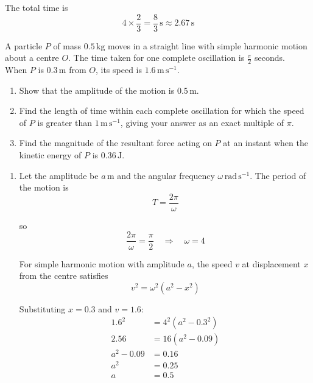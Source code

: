 \documentclass[leqno]{article}
\begin{document}
\begin{enumerate}[
  label=\textbf{\arabic*.},
  leftmargin=*,
  topsep=0pt,
  partopsep=0pt,
  parsep=0pt
]
\begin{djsSolution}
\begin{enumerate}[label=\textbf{(\alph*)}, start=1]
The total time is
\[
4\times\frac{2}{3}=\frac{8}{3}\,\mathrm{s}\approx 2.67\,\mathrm{s}
\]
\end{enumerate}
\end{djsSolution}

\newpage

\questionitem

A particle $P$ of mass $0.5\,\mathrm{kg}$ moves in a straight line with simple harmonic motion about a centre $O$. The time taken for one complete oscillation is $\frac{\pi}{2}$ seconds. \\
When $P$ is $0.3\,\mathrm{m}$ from $O$, its speed is $1.6\,\mathrm{m\,s^{-1}}$. \\
\begin{enumerate}[label=\textbf{(\alph*)}]
\item Show that the amplitude of the motion is $0.5\,\mathrm{m}$.  \\
\item Find the length of time within each complete oscillation for which the speed of $P$ is greater than $1\,\mathrm{m\,s^{-1}}$, giving your answer as an exact multiple of $\pi$.  \\
\item Find the magnitude of the resultant force acting on $P$ at an instant when the kinetic energy of $P$ is $0.36\,\mathrm{J}$.  \\
\end{enumerate}

\vspace*{10pt}

\begin{djsSolution}
\begin{enumerate}[label=\textbf{(\alph*)}, start=1]
\item Let the amplitude be \(a\,\mathrm{m}\) and the angular frequency \(\omega\,\mathrm{rad\,s^{-1}}\). The period of the motion is
\[
T=\dfrac{2\pi}{\omega}
\]

so
\[
\dfrac{2\pi}{\omega}=\dfrac{\pi}{2}\quad\Longrightarrow\quad \omega=4
\]

For simple harmonic motion with amplitude \(a\), the speed \(v\) at displacement \(x\) from the centre satisfies
\[
v^2=\omega^2\left(a^2-x^2\right)
\]

Substituting \(x=0.3\) and \(v=1.6\):
\begin{align*}
1.6^2&=4^2\left(a^2-0.3^2\right)\\
2.56&=16\left(a^2-0.09\right)\\
a^2-0.09&=0.16\\
a^2&=0.25\\
a&=0.5
\end{align*}


\end{enumerate}
\end{djsSolution}
\end{enumerate}
\end{document}
